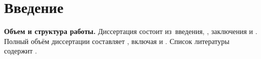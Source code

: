 \chapter*{Введение}                         %

\newcommand{\actuality}{}
\newcommand{\progress}{}
\newcommand{\aim}{{\textbf\aimTXT}}
\newcommand{\tasks}{\textbf{\tasksTXT}}
\newcommand{\novelty}{\textbf{\noveltyTXT}}
\newcommand{\influence}{\textbf{\influenceTXT}}
\newcommand{\methods}{\textbf{\methodsTXT}}
\newcommand{\defpositions}{\textbf{\defpositionsTXT}}
\newcommand{\reliability}{\textbf{\reliabilityTXT}}
\newcommand{\probation}{\textbf{\probationTXT}}
\newcommand{\contribution}{\textbf{\contributionTXT}}
\newcommand{\publications}{\textbf{\publicationsTXT}}


\textbf{Объем и структура работы.} Диссертация состоит из~введения,
,
заключения и
.
%
Полный объём диссертации составляет
, включая
 и
.
Список литературы содержит
.


